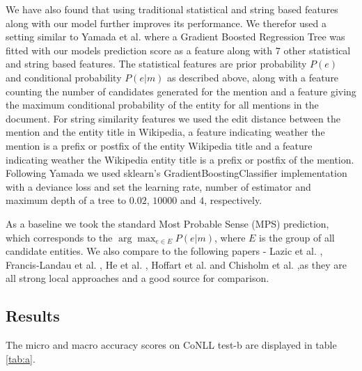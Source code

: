 \documentclass[11pt]{article}
\begin{document}
	We have also found that using traditional statistical and string based features along with our model further improves its performance. We therefor used a setting similar to Yamada et al. \cite{yamada2016joint} where a Gradient Boosted Regression Tree was fitted with our models prediction score as a feature along with $7$ other statistical and string based features. The statistical features are prior probability $P(e)$ and conditional probability $P(e|m)$ as described above, along with a feature counting the number of candidates generated for the mention and a feature giving the maximum conditional probability of the entity for all mentions in the document. For string similarity features we used the edit distance between the mention and the entity title in Wikipedia, a feature indicating weather the mention is a prefix or postfix of the entity Wikipedia title and a feature indicating weather the Wikipedia entity title is a prefix or postfix of the mention. Following Yamada we used sklearn's GradientBoostingClassifier implementation \cite{pedregosa2011scikit} with a deviance loss and set the learning rate, number of estimator and maximum depth of a tree to $0.02$, $10000$ and $4$, respectively. 
	
	As a baseline we took the standard Most Probable Sense (MPS) prediction, which corresponds to the $\arg\max_{e\in{{E}}}{P(e|m)}$, where $E$ is the group of all candidate entities.
	We also compare to the following papers - Lazic et al. \cite{Lazic2015}, Francis-Landau et al. \cite{Francis-Landau2016}, He et al. \cite{He2013}, Hoffart et al. \cite{hoffart2011robust} and Chisholm et al. \cite{Chisholm2015} ,as they are all strong local approaches and a good source for comparison.
		
	\subsection{Results}
	
	The micro and macro accuracy scores on CoNLL test-b are displayed in table \ref{tab:a}. 
	
\end{document}
